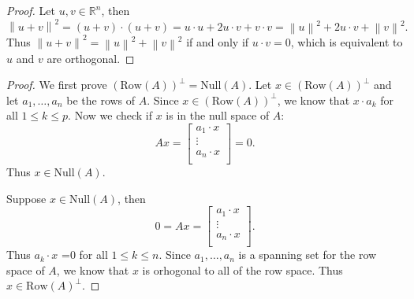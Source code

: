 \documentclass[12pt,letterpaper]{article}
\newcommand{\norm}[1]{\left\lVert#1\right\rVert}
\begin{document}
\begin{enumerate}
\Answer 

\begin{proof}
	Let $u, v \in \mathbb{R}^n$, then $$\norm{u+v}^2 =(u+v)\cdot (u+v)=u \cdot u +2 u \cdot v + v \cdot v =\norm{u}^2 +2 u\cdot v+ \norm{v}^2.$$ Thus $\norm{u+v}^2=\norm{u}^2+\norm{v}^2$ if and only if $u \cdot v =0$, which is equivalent to $u$ and $v$ are orthogonal.
\end{proof}

\Answer
\begin{proof}
	We first prove $(\text{Row}(A))^{\perp} = \text{Null}(A)$. Let $x \in (\text{Row}(A))^{\perp}$ and let $a_1, \dots, a_n$ be the rows of $A$. Since $x \in (\text{Row}(A))^{\perp}$, we know that $x \cdot a_k$ for all $1 \leq k \leq p$. Now we check if $x$ is in the null space of $A$: $$Ax = \begin{bmatrix} a_1 \cdot x\\ \vdots\\ a_n \cdot x\\ \end{bmatrix} =0.$$ Thus $x \in \text{Null}(A)$.
	
	Suppose $x \in \text{Null}(A)$, then $$0=Ax = \begin{bmatrix} a_1 \cdot x\\ \vdots\\ a_n \cdot x\\ \end{bmatrix}.$$ Thus $a_k \cdot x$ =0 for all $1\leq k \leq n$. Since $a_1, \dots, a_n$ is a spanning set for the row space of $A$, we know that $x$ is orhogonal to all of the row space. Thus $x \in \text{Row}(A)^\perp$.
	

\end{proof}
\end{enumerate}
\end{document}
